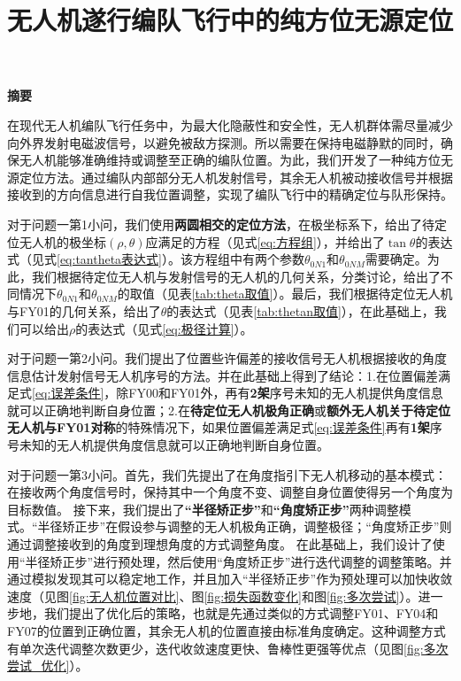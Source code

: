 \documentclass[12pt,AutoFakeSlant,AutoFakeBold]{article}
\title{无人机遂行编队飞行中的纯方位无源定位}
\makeatletter
\let\Mytitle\@title
\makeatother
\begin{document}

\centerline{\Huge\heiti\textbf{\Mytitle}}

\vspace{1em} %

\centerline{\Large\heiti\textbf{摘\quad 要}}

\vspace{1em} %

在现代无人机编队飞行任务中，为最大化隐蔽性和安全性，无人机群体需尽量减少向外界发射电磁波信号，以避免被敌方探测。所以需要在保持电磁静默的同时，确保无人机能够准确维持或调整至正确的编队位置。为此，我们开发了一种纯方位无源定位方法。通过编队内部部分无人机发射信号，其余无人机被动接收信号并根据接收到的方向信息进行自我位置调整，实现了编队飞行中的精确定位与队形保持。

对于问题一第1小问，我们使用\textbf{两圆相交的定位方法}，在极坐标系下，给出了待定位无人机的极坐标$\left(\rho,\theta\right)$应满足的方程（见式\ref{eq:方程组}），并给出了$\tan\theta$的表达式（见式\ref{eq:tantheta表达式}）。该方程组中有两个参数$\theta_{0N1}$和$\theta_{0NM}$需要确定。为此，我们根据待定位无人机与发射信号的无人机的几何关系，分类讨论，给出了不同情况下$\theta_{0N1}$和$\theta_{0NM}$的取值（见表\ref{tab:theta取值}）。最后，我们根据待定位无人机与FY01的几何关系，给出了$\theta$的表达式（见表\ref{tab:thetan取值}），在此基础上，我们可以给出$\rho$的表达式（见式\ref{eq:极径计算}）。

对于问题一第2小问。我们提出了位置些许偏差的接收信号无人机根据接收的角度信息估计发射信号无人机序号的方法。并在此基础上得到了结论：1.在位置偏差满足式\ref{eq:误差条件}，除FY00和FY01外，再有\textbf{2架}序号未知的无人机提供角度信息就可以正确地判断自身位置；2.在\textbf{待定位无人机极角正确}或\textbf{额外无人机关于待定位无人机与FY01对称}的特殊情况下，如果位置偏差满足式\ref{eq:误差条件}再有\textbf{1架}序号未知的无人机提供角度信息就可以正确地判断自身位置。

对于问题一第3小问。首先，我们先提出了在角度指引下无人机移动的基本模式：在接收两个角度信号时，保持其中一个角度不变、调整自身位置使得另一个角度为目标数值。
接下来，我们提出了\textbf{“半径矫正步”}和\textbf{“角度矫正步”}两种调整模式。“半径矫正步”在假设参与调整的无人机极角正确，调整极径；“角度矫正步”则通过调整接收到的角度到理想角度的方式调整角度。
在此基础上，我们设计了使用“半径矫正步”进行预处理，然后使用“角度矫正步”进行迭代调整的调整策略。并通过模拟发现其可以稳定地工作，并且加入“半径矫正步”作为预处理可以加快收敛速度（见图\ref{fig:无人机位置对比}、图\ref{fig:损失函数变化}和图\ref{fig:多次尝试}）。进一步地，我们提出了优化后的策略，也就是先通过类似的方式调整FY01、FY04和FY07的位置到正确位置，其余无人机的位置直接由标准角度确定。这种调整方式有单次迭代调整次数更少，迭代收敛速度更快、鲁棒性更强等优点（见图\ref{fig:多次尝试_优化}）。
\end{document}

